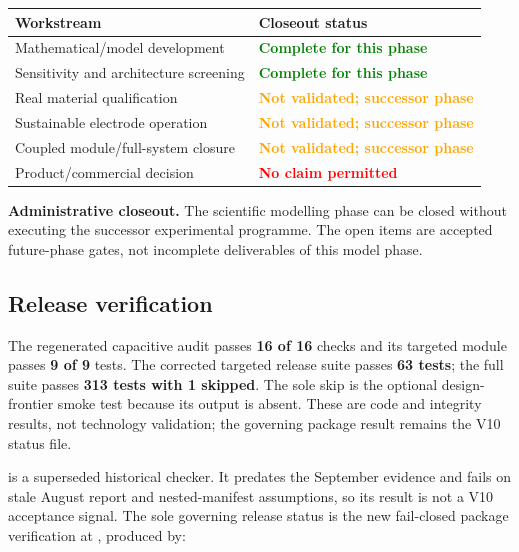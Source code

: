 \documentclass[10pt,a4paper]{article}
\begin{document}
\begin{center}
\begin{tabularx}{\textwidth}{@{}Yp{57mm}@{}}
\toprule
\textbf{Workstream} & \textbf{Closeout status} \\
\midrule
Mathematical/model development & \textcolor{Green}{\textbf{Complete for this phase}} \\
Sensitivity and architecture screening & \textcolor{Green}{\textbf{Complete for this phase}} \\
Real material qualification & \textcolor{Orange}{\textbf{Not validated; successor phase}} \\
Sustainable electrode operation & \textcolor{Orange}{\textbf{Not validated; successor phase}} \\
Coupled module/full-system closure & \textcolor{Orange}{\textbf{Not validated; successor phase}} \\
Product/commercial decision & \textcolor{Red}{\textbf{No claim permitted}} \\
\bottomrule
\end{tabularx}
\end{center}

\begin{gobox}
\textbf{Administrative closeout.} The scientific modelling phase can be
closed without executing the successor experimental programme. The open items
are accepted future-phase gates, not incomplete deliverables of this model
phase.
\end{gobox}

\subsection*{Release verification}

The regenerated capacitive audit passes \textbf{16 of 16} checks and its
targeted module passes \textbf{9 of 9} tests. The corrected targeted release
suite passes \textbf{63 tests}; the full suite passes \textbf{313 tests with 1
skipped}. The sole skip is the optional design-frontier smoke test because its
output is absent. These are code and integrity results, not technology
validation; the governing package result remains the V10 status file.

 is a superseded historical
checker. It predates the September evidence and fails on stale August report
and nested-manifest assumptions, so its result is not a V10 acceptance signal.
The sole governing release status is the new fail-closed package verification
at
,
produced by:
\end{document}
